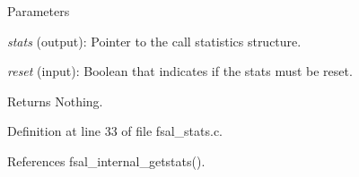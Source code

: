 \begin{DoxyParams}{Parameters}
\item[{\em stats}](output): Pointer to the call statistics structure. \item[{\em reset}](input): Boolean that indicates if the stats must be reset.\end{DoxyParams}
\begin{DoxyReturn}{Returns}
Nothing. 
\end{DoxyReturn}


Definition at line 33 of file fsal\_\-stats.c.

References fsal\_\-internal\_\-getstats().